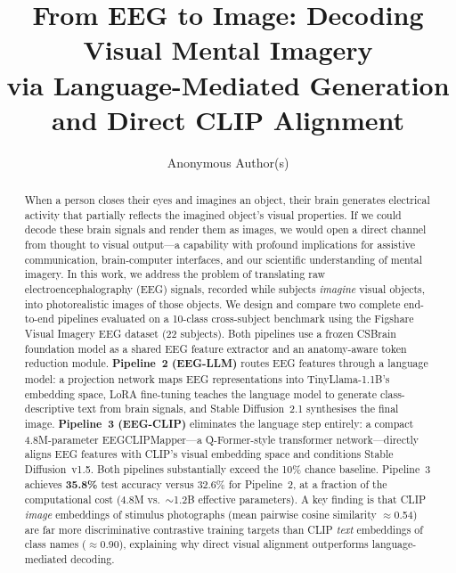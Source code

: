 \documentclass{article}
\title{From EEG to Image: Decoding Visual Mental Imagery\\
via Language-Mediated Generation and Direct CLIP Alignment}
\author{%
  Anonymous Author(s)\\
}
\begin{document}
\maketitle

\begin{abstract}
When a person closes their eyes and imagines an object, their brain generates electrical activity that partially reflects the imagined object's visual properties. If we could decode these brain signals and render them as images, we would open a direct channel from thought to visual output---a capability with profound implications for assistive communication, brain-computer interfaces, and our scientific understanding of mental imagery. In this work, we address the problem of translating raw electroencephalography (EEG) signals, recorded while subjects \emph{imagine} visual objects, into photorealistic images of those objects. We design and compare two complete end-to-end pipelines evaluated on a 10-class cross-subject benchmark using the Figshare Visual Imagery EEG dataset (22 subjects). Both pipelines use a frozen CSBrain foundation model as a shared EEG feature extractor and an anatomy-aware token reduction module. \textbf{Pipeline~2 (EEG-LLM)} routes EEG features through a language model: a projection network maps EEG representations into TinyLlama-1.1B's embedding space, LoRA fine-tuning teaches the language model to generate class-descriptive text from brain signals, and Stable Diffusion~2.1 synthesises the final image. \textbf{Pipeline~3 (EEG-CLIP)} eliminates the language step entirely: a compact 4.8M-parameter EEGCLIPMapper---a Q-Former-style transformer network---directly aligns EEG features with CLIP's visual embedding space and conditions Stable Diffusion~v1.5. Both pipelines substantially exceed the 10\% chance baseline. Pipeline~3 achieves \textbf{35.8\%} test accuracy versus 32.6\% for Pipeline~2, at a fraction of the computational cost (4.8M vs.\ $\sim$1.2B effective parameters). A key finding is that CLIP \emph{image} embeddings of stimulus photographs (mean pairwise cosine similarity $\approx$0.54) are far more discriminative contrastive training targets than CLIP \emph{text} embeddings of class names ($\approx$0.90), explaining why direct visual alignment outperforms language-mediated decoding.
\end{abstract}

\end{document}

